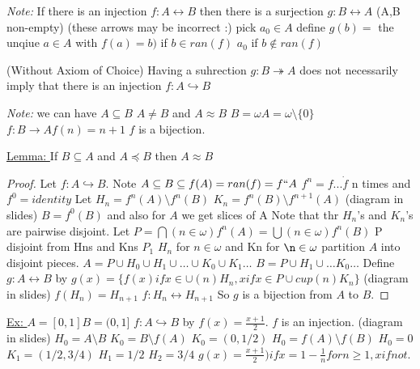 
%
%
%

\newcommand{\set}[1]{\{#1\}}

\emph{Note: } If there is an injection $f : A \leftrightarrow B$ then there is a surjection $g : B \leftrightarrow A$ (A,B non-empty) (these arrows may be incorrect :)
pick $a_0 \in A$
define $g(b) = $ the unqiue $a \in A$ with $f(a) = b)$ if $b \in ran(f)$ $a_0$ if $b \notin ran(f)$

 (Without Axiom of Choice) Having a suhrection $g : B \twoheadrightarrow A$ does not necessarily imply that there is an injection $f : A \hookrightarrow B$

\emph{Note: } we can have $A \subseteq B$ $A \neq B$ and $A \approx B$
$B = \omega A = \omega \setminus \{0\}$
$f : B \rightarrow A f(n) = n+1$
$f$ is a bijection.

\underline{Lemma: } If $B \subseteq A$ and $A \preceq B$ then $A \approx B$

\begin{proof}
    Let $f : A \hookrightarrow B$.
    Note $A \subseteq B \subseteq f(A) = ran(f) = f``A$
    $f^n = f \dot ... \dot f$ n times and $f^0 = identity$
    Let $H_n = f^n(A) \setminus f^n(B)$
    $K_n = f^n(B) \setminus f^{n+1}(A)$
    (diagram in slides)
    $B = f^0(B)$ and also for $A$
    we get slices of A
    Note that thr $H_n$'s and $K_n$'s are pairwise disjoint.
    Let $P = \bigcap (n \in \omega) f^n(A) = \bigcup (n \in \omega) f^n(B)$
    P disjoint from Hns and Kns
    $P_1$ $H_n$ for $n \in \omega$ and Kn for $\n \in \omega$
    partition $A$ into disjoint pieces.
    $A = P \cup H_0 \cup H_1 \cup \dots \cup K_0 \cup K_1 \dots$
    $B = P \cup H_1 \cup \dots K_0 \dots$
    Define $g : A \leftrightarrow B$ by
    $g(x) = \{f(x) if x \in \cup (n) H_n , x if x \in P \cup cup (n) K_n\}$
    (diagram in slides)
    $f(H_n) = H_{n+1}$
    $f : H_n \leftrightarrow H_{n+1}$
    So $g$ is a bijection from $A$ to $B$.
\end{proof}

\underline{Ex: } $A = [0,1] B = (0,1]$
$f : A \hookrightarrow B$ by $f(x) = \frac{x+1}{2}$.
$f$ is an injection.
(diagram in slides)
$H_0 = A \setminus B$
$K_0 = B \setminus f(A)$
$K_0 = (0,1/2)$
$H_0 = f(A) \setminus f(B)$
$H_0 = 0$
$K_1 = (1/2,3/4)$
$H_1 = 1/2$
$H_2 = 3/4$
$g(x) = \frac{x+1}{2}) if x = 1-\frac{1}{n} for n \geq 1, x if not$.



